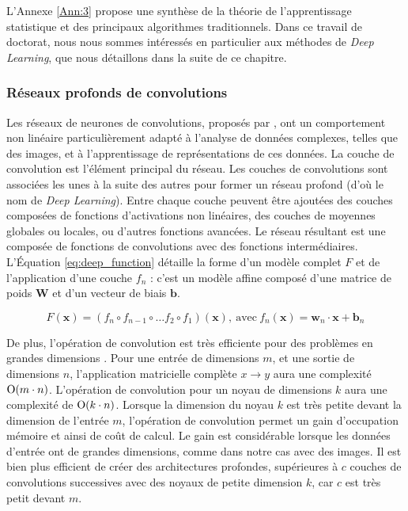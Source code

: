 L'Annexe \ref{Ann:3} propose une synthèse de la théorie de l'apprentissage statistique et des principaux algorithmes traditionnels.
Dans ce travail de doctorat, nous nous sommes intéressés en particulier aux méthodes de \textit{Deep Learning}, que nous détaillons dans la suite de ce chapitre.

\subsubsection{Réseaux profonds de convolutions} \label{subsubsec:deep_learning}
Les réseaux de neurones de convolutions, proposés par \citeauthor{lecun_backpropagation_1989} \cite{lecun_backpropagation_1989}, ont un comportement non linéaire particulièrement adapté à l'analyse de données complexes, telles que des images, et à l'apprentissage de représentations de ces données.
La couche de convolution est l'élément principal du réseau.
Les couches de convolutions sont associées les unes à la suite des autres pour former un réseau profond (d'où le nom de \textit{Deep Learning}).
Entre chaque couche peuvent être ajoutées des couches composées de fonctions d'activations non linéaires, des couches de moyennes globales ou locales, ou d'autres fonctions avancées.
Le réseau résultant est une composée de fonctions de convolutions avec des fonctions intermédiaires.
L'Équation \ref{eq:deep_function} détaille la forme d'un modèle complet $F$ et de l'application d'une couche $f_n$ : c'est un modèle affine composé d'une matrice de poids $\mathbf{W}$ et d'un vecteur de biais $\mathbf{b}$.

\begin{equation} \label{eq:deep_function}
F(\mathbf{x}) = \left(f_{n} \circ f_{n-1} \circ \ldots f_{2} \circ f_{1}\right)(\mathbf{x}), \ \text{avec} \ f_n(\mathbf{x}) = \mathbf{w}_n \cdot \mathbf{x} + \mathbf{b}_n
\end{equation}

De plus, l'opération de convolution est très efficiente pour des problèmes en grandes dimensions \cite{goodfellow_deep_2016}.
Pour une entrée de dimensions $m$, et une sortie de dimensions $n$, l'application matricielle complète $x \rightarrow y$ aura une complexité $\operatorname{O}(m \cdot n)$.
L'opération de convolution pour un noyau de dimensions $k$ aura une complexité de $\operatorname{O}(k \cdot n)$.
Lorsque la dimension du noyau $k$ est très petite devant la dimension de l'entrée $m$, l'opération de convolution permet un gain d'occupation mémoire et ainsi de coût de calcul.
Le gain est considérable lorsque les données d'entrée ont de grandes dimensions, comme dans notre cas avec des images.
Il est bien plus efficient de créer des architectures profondes, supérieures à $c$ couches de convolutions successives avec des noyaux de petite dimension $k$, car $c$ est très petit devant $m$.

